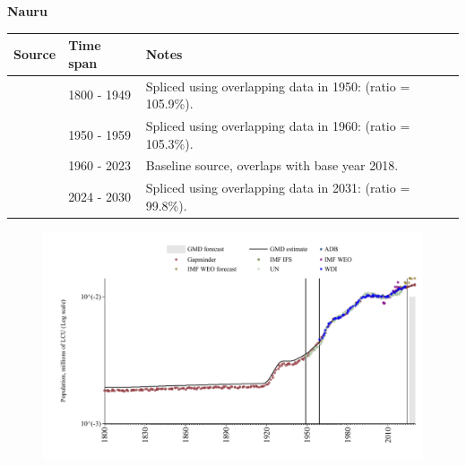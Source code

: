 \documentclass[12pt,a4paper,landscape]{article}
\begin{document}
\begin{adjustbox}{max totalsize={\paperwidth}{\paperheight},center}
\begin{minipage}[t][\textheight][t]{\textwidth}
\vspace*{0.5cm}
{}
\begin{center}
{\Large\bfseries Nauru}
\end{center}
\vspace{0.5cm}
\begin{table}[H]
\centering
\small
\begin{tabular}{|l|l|l|}
\hline
\textbf{Source} & \textbf{Time span} & \textbf{Notes} \\
\hline
\rowcolor{white}\cite{Gapminder}& 1800 - 1949 &Spliced using overlapping data in 1950: (ratio = 105.9\%).\\
\rowcolor{lightgray}\cite{IMF_IFS}& 1950 - 1959 &Spliced using overlapping data in 1960: (ratio = 105.3\%).\\
\rowcolor{white}\cite{WDI}& 1960 - 2023 &Baseline source, overlaps with base year 2018.\\
\rowcolor{lightgray}\cite{Gapminder}& 2024 - 2030 &Spliced using overlapping data in 2031: (ratio = 99.8\%).\\
\hline
\end{tabular}
\end{table}
\begin{figure}[H]
\centering
\includegraphics[width=\textwidth,height=0.6\textheight,keepaspectratio]{graphs/NRU_pop.pdf}
\end{figure}
\end{minipage}
\end{adjustbox}
\end{document}
